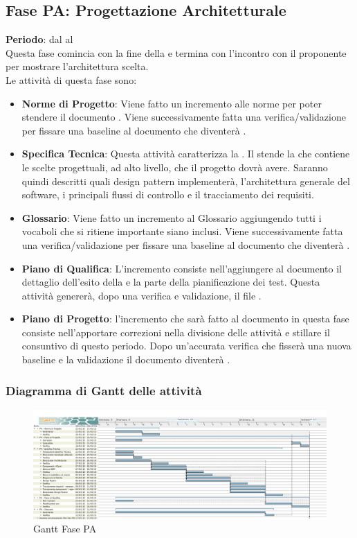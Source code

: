 \subsection{Fase PA: Progettazione Architetturale}
	\textbf{Periodo}: dal  al  \\Questa fase comincia con la fine della  e termina con l'incontro con il proponente per mostrare l'architettura scelta.\\
	Le attività di questa fase sono:
	\begin{itemize}
		\item \textbf{Norme di Progetto}: Viene fatto un incremento alle norme per poter stendere il documento . Viene successivamente fatta una verifica/validazione per fissare una baseline al documento che diventerà .
		\item \textbf{Specifica Tecnica}: Questa attività caratterizza la . Il  stende la  che contiene le scelte progettuali, ad alto livello, che il progetto dovrà avere. Saranno quindi descritti quali design pattern \projectname{} implementerà, l'architettura generale del software, i principali flussi di controllo e il tracciamento dei requisiti.
		\item \textbf{Glossario}: Viene fatto un incremento al Glossario aggiungendo tutti i vocaboli che si ritiene importante siano inclusi. Viene successivamente fatta una verifica/validazione per fissare una baseline al documento che diventerà .
		\item \textbf{Piano di Qualifica}: L'incremento consiste nell'aggiungere al documento  il dettaglio dell'esito della  e la parte della pianificazione dei test. Questa attività genererà, dopo una verifica e validazione, il file .
		\item \textbf{Piano di Progetto}: l'incremento che sarà fatto al documento  in questa fase consiste nell'apportare correzioni nella divisione delle attività e stillare il consuntivo di questo periodo. Dopo un'accurata verifica che fisserà una nuova baseline e la validazione il documento diventerà .
	\end{itemize}
	\subsubsection{Diagramma di Gantt delle attività}
	\begin{figure}[H]\centering
		\includegraphics[width=\textwidth]{PianoDiProgetto/Pics/FasePA.png}
	\caption{Gantt Fase PA}
\end{figure}